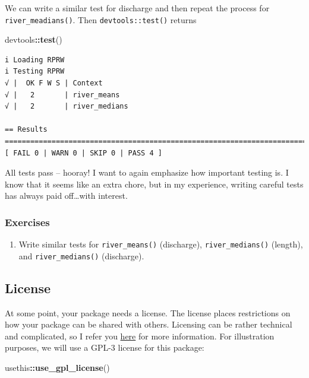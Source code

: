 \documentclass[
]{book}
\newenvironment{Shaded}{\begin{snugshade}}{\end{snugshade}}
\newcommand{\KeywordTok}[1]{\textcolor[rgb]{0.13,0.29,0.53}{\textbf{#1}}}
\newcommand{\NormalTok}[1]{#1}
\newcommand{\OperatorTok}[1]{\textcolor[rgb]{0.81,0.36,0.00}{\textbf{#1}}}
\providecommand{\tightlist}{%
  \setlength{\itemsep}{0pt}\setlength{\parskip}{0pt}}
\begin{document}
We can write a similar test for discharge and then repeat the process for \texttt{river\_meadians()}. Then \texttt{devtools::test()} returns

\begin{Shaded}
\begin{Highlighting}[]
\NormalTok{devtools}\OperatorTok{::}\KeywordTok{test}\NormalTok{()}
\end{Highlighting}
\end{Shaded}

\begin{verbatim}
i Loading RPRW
i Testing RPRW
√ |  OK F W S | Context
√ |   2       | river_means                                                         
√ |   2       | river_medians                                                       

== Results =========================================================================
[ FAIL 0 | WARN 0 | SKIP 0 | PASS 4 ]
\end{verbatim}

All tests pass -- hooray! I want to again emphasize how important testing is. I know that it seems like an extra chore, but in my experience, writing careful tests has always paid off\ldots with interest.

\hypertarget{ex-set4}{%
\subsubsection{Exercises}\label{ex-set4}}

\begin{enumerate}
\def\labelenumi{\arabic{enumi}.}
\tightlist
\item
  Write similar tests for \texttt{river\_means()} (discharge), \texttt{river\_medians()} (length), and \texttt{river\_medians()} (discharge).
\end{enumerate}

\hypertarget{license}{%
\subsection{License}\label{license}}

At some point, your package needs a license. The license places restrictions on how your package can be shared with others. Licensing can be rather technical and complicated, so I refer you \href{https://r-pkgs.org/license.html}{here} for more information. For illustration purposes, we will use a GPL-3 license for this package:

\begin{Shaded}
\begin{Highlighting}[]
\NormalTok{usethis}\OperatorTok{::}\KeywordTok{use_gpl_license}\NormalTok{()}
\end{Highlighting}
\end{Shaded}
\end{document}
